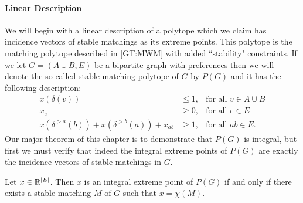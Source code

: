 \paragraph{Linear Description}
We will begin with a linear description of a polytope which we claim has incidence vectors of stable matchings as its extreme points. This polytope is the matching polytope described in \ref{GT:MWM} with added ``stability" constraints. If we let $G=(A\cup B, E)$ be a bipartite graph with preferences then we will denote the so-called stable matching polytope of $G$ by $P(G)$ and it has the following description:
\begin{align}
x(\delta(v)) &\leq 1, &\text{for all } v \in A\cup B \label{constraint:one}\\
x_e &\geq 0, &\text{for all } e \in E \label{constraint:nonneg}\\
x(\delta^{>a}(b)) + x(\delta^{>b}(a)) + x_{ab} &\geq 1, &\text{for all } ab \in E.\label{constraint:stab}
\end{align}
Our major theorem of this chapter is to demonstrate that $P(G)$ is integral, but first we must verify that indeed the integral extreme points of $P(G)$ are exactly the incidence vectors of stable matchings in $G$.
\begin{lemma}\label{lemma:int-P}
Let $x \in \mathbb{R}^{\left|E\right|}$. Then $x$ is an integral extreme point of $P(G)$ if and only if there exists a stable matching $M$ of $G$ such that $x = \chi(M)$.
\end{lemma}
